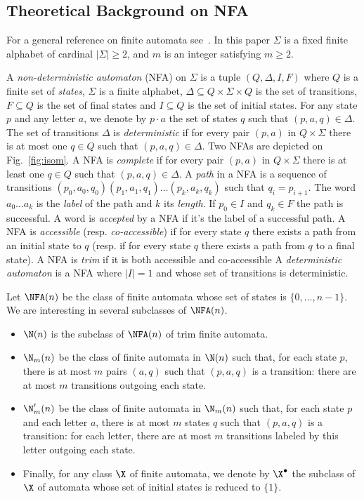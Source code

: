 \subsection{Theoretical Background on NFA}\label{sec:theoryNFA}


For a general reference on finite automata see~\cite{Hopcroft}.  In
this paper $\Sigma$ is a fixed finite alphabet of cardinal
$|\Sigma|\geq 2$, and $m$ is an integer satisfying $m\geq 2$.

A {\it non-deterministic automaton} (NFA) on $\Sigma$ is a tuple $(Q,
\Delta,I,F)$ where $Q$ is a finite set of {\it states}, $\Sigma$ is a finite
alphabet, $\Delta\subseteq Q\times \Sigma \times Q$ is the set of
transitions, $F\subseteq Q$ is the set of final states and $I\subseteq
Q$ is the set of initial states.  For any state $p$ and any letter
$a$, we denote by $p\cdot a$ the set of states $q$ such that
$(p,a,q)\in\Delta$.  The set of transitions $\Delta$ is {\it
deterministic} if for every pair $(p,a)$ in $Q\times\Sigma$ there is
at most one $q\in Q$ such that $(p,a,q)\in \Delta$. Two NFAs are
depicted on Fig.~\ref{fig:isom}.  A NFA is {\it complete} if for every
pair $(p,a)$ in $Q\times\Sigma$ there is at least one $q\in Q$ such
that $(p,a,q)\in \Delta$.  A {\it path} in a NFA is a sequence of
transitions $(p_0,a_0,q_0)(p_1,a_1,q_1)\ldots(p_k,a_k,q_k)$ such that
$q_i=p_{i+1}$. The word $a_0\ldots a_k$ is the {\it label} of the path
and $k$ its {\it length}. If $p_0\in I$ and $q_k\in F$ the path is
successful. A word is {\it accepted} by a NFA if it's the label of a
successful path.  A NFA is {\it accessible} (resp.  {\it
co-accessible}) if for every state $q$ there exists a path from an
initial state to $q$ (resp. if for every state $q$ there exists a path
from $q$ to a final state).  A NFA is {\it trim} if it is both
accessible and co-accessible A {\it deterministic automaton} is a NFA
where $|I|=1$ and whose set of transitions is deterministic.

Let $\NFA(n)$ be the class of  finite automata whose set of states is
$\{0,\ldots,n-1\}$. We are interesting in several subclasses of $\NFA(n)$.
\begin{itemize}
\item $\N(n)$ is the subclass of $\NFA(n)$ of trim finite automata.
\item  $\N_m(n)$ be the class of
finite automata in  $\N(n)$ such that, for each state $p$, there is at most $m$
pairs $(a,q)$ such that $(p,a,q)$ is a transition: there are at most $m$
transitions outgoing each state. 
\item $\N^\prime_m(n)$ be the class of
finite automata in  $\N_m(n)$ such that, for each state $p$ and each
letter $a$, there is at most $m$
states $q$ such that $(p,a,q)$ is a transition: for each letter, there are
at most $m$ transitions labeled by this letter  outgoing each state.
\item Finally, for any class $\X$ of finite automata, we denote by $\X^{\bullet}$ the
subclass of $\X$ of automata whose set of initial states is reduced to
$\{1\}$.  
\end{itemize}

